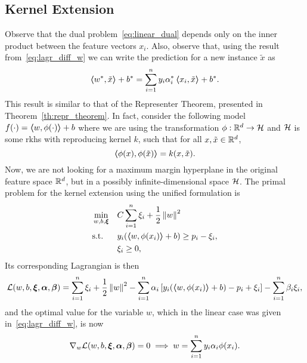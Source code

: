 \subsection{Kernel Extension}
Observe that the dual problem~\eqref{eq:linear_dual} depends only on the inner product between the feature vectors $x_i$. Also, observe that, using the result from~\eqref{eq:lagr_diff_w} we can write the prediction for a new instance $\tilde{x}$ as 
\begin{equation}
    \nonumber
    \bm{\left\langle} {w}^*, \tilde{x} \bm{\right\rangle} + {b}^* = \sum_{i = 1}^n y_i {\alpha}^*_i \bm{\left\langle} x_i, \tilde{x} \bm{\right\rangle} + {b}^* .
\end{equation} 
This result is similar to that of the Representer Theorem, presented in Theorem~\ref{th:repr_theorem}.
In fact, consider the following model 
$f(\cdot) = \bm{\left\langle} w, \phi(\cdot) \bm{\right\rangle} + b$
where we are using the transformation $\phi: \mathbb{R}^d \to \mathcal{H}$ and $\mathcal{H}$ is some \acrshort{rkhs} with reproducing kernel $k$, such that for all $x, \tilde{x} \in \mathbb{R}^d$, 
$$ \bm{\left\langle} \phi(x), \phi(\tilde{x}) \bm{\right\rangle} = k(x, \tilde{x}) .$$ 
Now, we are not looking for a maximum margin hyperplane in the original feature space $\mathbb{R}^d$, but in a possibly infinite-dimensional space $\mathcal{H}$.
The primal problem for the kernel extension using the unified formulation is
\begin{equation}
    \label{eq:kernel_primal}
    \begin{aligned}
        &\min_{w, b, \fv{\xi}} & & C \sum_{i=1}^\nsamples \xi_i + \frac{1}{2} \norm{w}^2 \\
        & \text{s.t.} & & y_i (\dotp{w}{\phi(x_i)} + b) \geq p_i - \xi_i , \\
        & & & \xi_i \geq 0 ,      
    \end{aligned}  
\end{equation}
Its corresponding Lagrangian is then 
\begin{equation}
    \nonumber
    \mathcal{L}(w, b, \bm{\xi}, \bm{\alpha}, \bm{\beta}) = \sum_{i=1}^n \xi_i + \frac{1}{2} \left\lVert w\right\rVert^2 - \sum_{i=1}^n \alpha_i \left[ y_i (\bm{\left\langle} w, \phi(x_i) \bm{\right\rangle} + b) - p_i + \xi_i \right] - \sum_{i=1}^n \beta_i \xi_i ,
\end{equation}
and the optimal value for the variable $w$, which in the linear case was given in~\ref{eq:lagr_diff_w}, is now
\begin{equation}\label{eq:lagr_diff_w_kernel}
    \nabla_w \lagr(w, b, \fv{\xi}, \fv{\alpha}, \fv{\beta}) = 0 \implies w = \sum_{i=1}^\nsamples y_i \alpha_i \phi(x_i) .
\end{equation}
